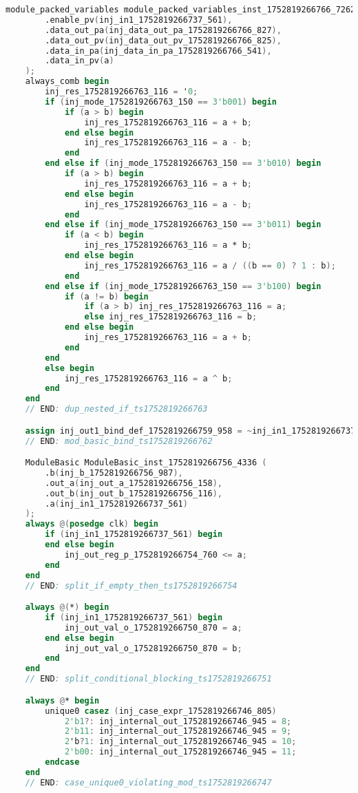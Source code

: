 \begin{lstlisting}[language=Verilog]
    module_packed_variables module_packed_variables_inst_1752819266766_7262 (
        .enable_pv(inj_in1_1752819266737_561),
        .data_out_pa(inj_data_out_pa_1752819266766_827),
        .data_out_pv(inj_data_out_pv_1752819266766_825),
        .data_in_pa(inj_data_in_pa_1752819266766_541),
        .data_in_pv(a)
    );
    always_comb begin
        inj_res_1752819266763_116 = '0;
        if (inj_mode_1752819266763_150 == 3'b001) begin
            if (a > b) begin
                inj_res_1752819266763_116 = a + b;
            end else begin
                inj_res_1752819266763_116 = a - b;
            end
        end else if (inj_mode_1752819266763_150 == 3'b010) begin
            if (a > b) begin
                inj_res_1752819266763_116 = a + b;
            end else begin
                inj_res_1752819266763_116 = a - b;
            end
        end else if (inj_mode_1752819266763_150 == 3'b011) begin
            if (a < b) begin
                inj_res_1752819266763_116 = a * b;
            end else begin
                inj_res_1752819266763_116 = a / ((b == 0) ? 1 : b);
            end
        end else if (inj_mode_1752819266763_150 == 3'b100) begin
            if (a != b) begin
                if (a > b) inj_res_1752819266763_116 = a;
                else inj_res_1752819266763_116 = b;
            end else begin
                inj_res_1752819266763_116 = a + b;
            end
        end
        else begin
            inj_res_1752819266763_116 = a ^ b;
        end
    end
    // END: dup_nested_if_ts1752819266763

    assign inj_out1_bind_def_1752819266759_958 = ~inj_in1_1752819266737_561;
    // END: mod_basic_bind_ts1752819266762

    ModuleBasic ModuleBasic_inst_1752819266756_4336 (
        .b(inj_b_1752819266756_987),
        .out_a(inj_out_a_1752819266756_158),
        .out_b(inj_out_b_1752819266756_116),
        .a(inj_in1_1752819266737_561)
    );
    always @(posedge clk) begin
        if (inj_in1_1752819266737_561) begin
        end else begin
            inj_out_reg_p_1752819266754_760 <= a;
        end
    end
    // END: split_if_empty_then_ts1752819266754

    always @(*) begin
        if (inj_in1_1752819266737_561) begin
            inj_out_val_o_1752819266750_870 = a;
        end else begin
            inj_out_val_o_1752819266750_870 = b;
        end
    end
    // END: split_conditional_blocking_ts1752819266751

    always @* begin
        unique0 casez (inj_case_expr_1752819266746_805)
            2'b1?: inj_internal_out_1752819266746_945 = 8;
            2'b11: inj_internal_out_1752819266746_945 = 9;  
            2'b?1: inj_internal_out_1752819266746_945 = 10; 
            2'b00: inj_internal_out_1752819266746_945 = 11; 
        endcase
    end
    // END: case_unique0_violating_mod_ts1752819266747


\end{lstlisting}
